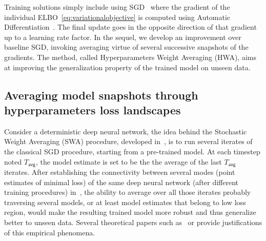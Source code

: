 \documentclass[tablecaption=bottom,wcp]{jmlr}
\begin{document}
Training solutions simply include using SGD~\citep{bottou2008tradeoffs} where the gradient of the individual ELBO~\eqref{eq:variationalobjective} is computed using Automatic Differentiation~\citep{kucukelbir2017automatic}. 
The final update goes in the opposite direction of that gradient up to a learning rate factor.
In the sequel, we develop an improvement over baseline SGD, invoking averaging virtue of several successive snapshots of the gradients.
The method, called Hyperparameters Weight Averaging (HWA), aims at improving the generalization property of the trained model on unseen data.


\subsection{Averaging model snapshots through hyperparameters loss landscapes}
Consider a deterministic deep neural network, the idea behind the Stochastic Weight Averaging (SWA) procedure, developed in~\citep{izmailov2018averaging}, is to run several iterates of the classical SGD procedure, starting from a pre-trained model.
At each timestep noted $T_{\mathsf{avg}}$, the model estimate is set to be the the average of the last $T_{\mathsf{avg}}$ iterates.
After establishing the connectivity between several modes (point estimates of minimal loss) of the same deep neural network (after different training procedures) in~\citep{garipov2018loss}, the ability to average over all those iterates probably traversing several models, or at least model estimates that belong to low loss region, would make the resulting trained model more robust and thus generalize better to unseen data.
Several theoretical papers such as~\citep{he2019asymmetric} or \citep{keskar2016large} provide justifications of this empirical phenomena.
\end{document}
